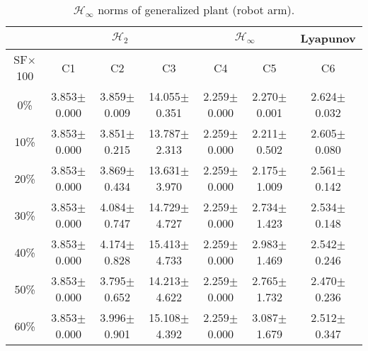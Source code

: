 \begin{table}[H]
\centering
\scriptsize
\begin{tabular}{| c || c | c | c | c | c | c |}
	\hline
	 & \multicolumn{3}{c|}{$\mathcal{H}_{2}$} & \multicolumn{2}{c|}{$\mathcal{H}_{\infty}$} & Lyapunov\\
	\hline
	SF$\times$100 & C1& C2 & C3 & C4 & C5 & C6\\
	\hline\hline
	0\% & 3.853$\pm$0.000 & 3.859$\pm$0.009 & 14.055$\pm$0.351 & 2.259$\pm$0.000 & 2.270$\pm$0.001 & 2.624$\pm$0.032\\
	\hline
	10\% & 3.853$\pm$0.000 & 3.851$\pm$0.215 & 13.787$\pm$2.313 & 2.259$\pm$0.000 & 2.211$\pm$0.502 & 2.605$\pm$0.080\\
	\hline
	20\% & 3.853$\pm$0.000 & 3.869$\pm$0.434 & 13.631$\pm$3.970 & 2.259$\pm$0.000 & 2.175$\pm$1.009 & 2.561$\pm$0.142\\
	\hline
	30\% & 3.853$\pm$0.000 & 4.084$\pm$0.747 & 14.729$\pm$4.727 & 2.259$\pm$0.000 & 2.734$\pm$1.423 & 2.534$\pm$0.148\\
	\hline
	40\% & 3.853$\pm$0.000 & 4.174$\pm$0.828 & 15.413$\pm$4.733 & 2.259$\pm$0.000 & 2.983$\pm$1.469 & 2.542$\pm$0.246\\
	\hline
	50\% & 3.853$\pm$0.000 & 3.795$\pm$0.652 & 14.213$\pm$4.622 & 2.259$\pm$0.000 & 2.765$\pm$1.732 & 2.470$\pm$0.236\\
	\hline
	60\% & 3.853$\pm$0.000 & 3.996$\pm$0.901 & 15.108$\pm$4.392 & 2.259$\pm$0.000 & 3.087$\pm$1.679 & 2.512$\pm$0.347\\
	\hline
\end{tabular}
\caption{$\mathcal{H}_{\infty}$ norms of generalized plant (robot arm).}
\label{table:hinfinity_norms_robot_arm:unc}
\end{table}

